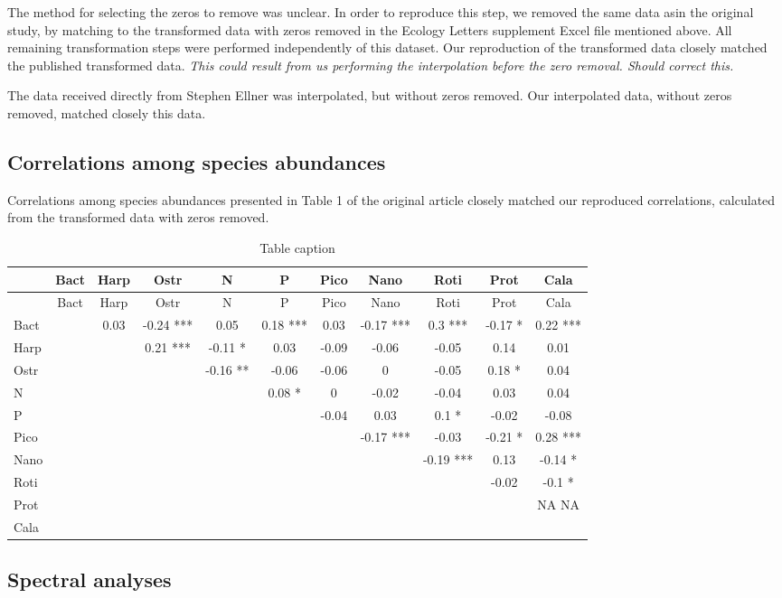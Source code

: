 \documentclass[10pt,a4paper,onecolumn]{article}
\begin{document}
The method for selecting the zeros to remove was unclear. In order to
reproduce this step, we removed the same data asin the original study,
by matching to the transformed data with zeros removed in the Ecology
Letters supplement Excel file mentioned above. All remaining
transformation steps were performed independently of this dataset. Our
reproduction of the transformed data closely matched the published
transformed data. \emph{This could result from us performing the
interpolation before the zero removal. Should correct this.}

The data received directly from Stephen Ellner was interpolated, but
without zeros removed. Our interpolated data, without zeros removed,
matched closely this data.

\subsection{Correlations among species
abundances}\label{correlations-among-species-abundances}

Correlations among species abundances presented in Table 1 of the
original article closely matched our reproduced correlations, calculated
from the transformed data with zeros removed.

\begin{longtable}[c]{@{}lcccccccccc@{}}
\caption{\label{tbl:table}Table caption }\tabularnewline
\toprule
& Bact & Harp & Ostr & N & P & Pico & Nano & Roti & Prot &
Cala\tabularnewline
\midrule
\endfirsthead
\toprule
& Bact & Harp & Ostr & N & P & Pico & Nano & Roti & Prot &
Cala\tabularnewline
\midrule
\endhead
Bact & & 0.03 & -0.24 *** & 0.05 & 0.18 *** & 0.03 & -0.17 *** & 0.3 ***
& -0.17 * & 0.22 ***\tabularnewline
Harp & & & 0.21 *** & -0.11 * & 0.03 & -0.09 & -0.06 & -0.05 & 0.14 &
0.01\tabularnewline
Ostr & & & & -0.16 ** & -0.06 & -0.06 & 0 & -0.05 & 0.18 * &
0.04\tabularnewline
N & & & & & 0.08 * & 0 & -0.02 & -0.04 & 0.03 & 0.04\tabularnewline
P & & & & & & -0.04 & 0.03 & 0.1 * & -0.02 & -0.08\tabularnewline
Pico & & & & & & & -0.17 *** & -0.03 & -0.21 * & 0.28 ***\tabularnewline
Nano & & & & & & & & -0.19 *** & 0.13 & -0.14 *\tabularnewline
Roti & & & & & & & & & -0.02 & -0.1 *\tabularnewline
Prot & & & & & & & & & & NA NA\tabularnewline
Cala & & & & & & & & & &\tabularnewline
\bottomrule
\end{longtable}

\subsection{Spectral analyses}\label{spectral-analyses}
\end{document}
